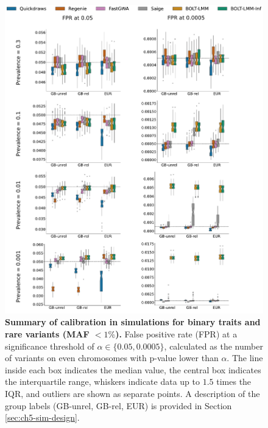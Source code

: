\begin{figure}[h!]
    \centering
    \includegraphics[width=\textwidth]{figures/sim_calibration/bt_fpr_rare.pdf}
    \caption{\textbf{Summary of calibration in simulations for binary traits and rare variants (MAF $< 1\%$).}
    False positive rate (FPR) at a significance threshold of $\alpha \in \{0.05, 0.0005\}$, calculated as the number of variants on even chromosomes with p-value lower than $\alpha$.
    The line inside each box indicates the median value, the central box indicates the interquartile range, whiskers indicate data up to $1.5$ times the IQR, and outliers are shown as separate points.
    A description of the group labels (GB-unrel, GB-rel, EUR) is provided in Section \ref{sec:ch5-sim-design}.
    \label{fig:qd_sim_fpr_bt2}
    }
\end{figure}

